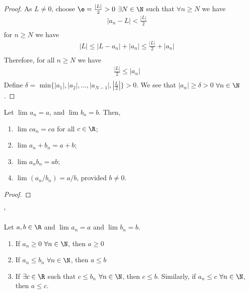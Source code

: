\begin{proof}
        As $L \neq 0$, choose $\e = \frac{\left|L\right|}{2} > 0$ $\exists N \in \N$ such that $\forall n \ge N$ we have
        \begin{align}
                \left|a_n - L\right| < \frac{\left|L\right|}{2}\\
        \end{align}
        for $n \ge N$ we have
        \begin{align}
                \left|L\right| \le \left|L - a_n\right| + \left|a_n\right| \le \frac{\left|L\right|}{2} + \left|a_n\right|\\
        \end{align}
        Therefore, for all $n \ge N$ we have
        \begin{align}
                \frac{\left|L\right|}{2} \le \left|a_n\right| \\
        \end{align}
Define $\delta = \text{ min}\{\left|a_1\right|, \left|a_2\right|, \ldots, \left|a_{N-1}\right|, \left|\frac{L}{2}\right|\} > 0$. We see that  $\left|a_n\right| \ge \delta > 0$ $\forall n \in \N$.
\end{proof}


\begin{theorem}
	Let $\lim_{} a_n = a$, and $\lim_{} b_n =b$. Then,
	\begin{enumerate}
		\item $\lim_{} ca_n = ca$ for all $c \in \R$;
		\item $\lim_{} a_n + b_n = a + b$;
		\item $\lim_{} a_n b_n = ab$;
		\item $\lim_{} \left( a_n / b_n \right) = a / b$, provided $b \neq 0$.
	\end{enumerate}
\end{theorem}

\begin{proof}
	
\end{proof}


`\begin{theorem}
        Let $a,b \in \R$ and $\lim_{} a_n = a$ and $\lim_{} b_n = b$.
        \begin{enumerate}
                \item If $a_n \ge 0$ $\forall n \in \N$, then $a \ge 0$
                \item If $a_n \le b_n$ $\forall n \in \N$, then $a \le b$
                \item If $\exists c \in \R$ such that $c \le b_n$ $\forall n \in \N$, then $c \le b$. Similarly, if $a_n \le c$ $\forall n \in \N$, then $a \le c$.
        \end{enumerate}
\end{theorem}

